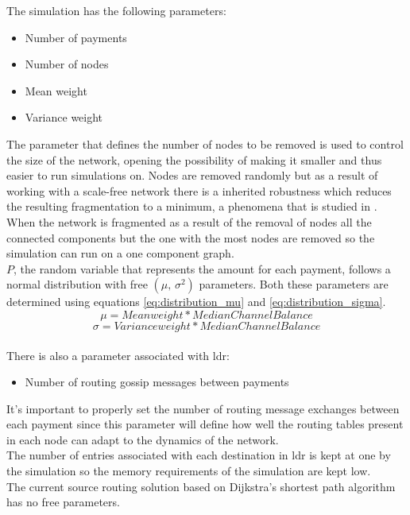 The simulation has the following parameters:
\begin{itemize}
    \item Number of payments
    \item Number of nodes
    \item Mean weight
    \item Variance weight
\end{itemize}
The parameter that defines the number of nodes to be removed is used to control the size of the network, opening the possibility of making it smaller and thus easier to run simulations on. Nodes are removed randomly but as a result of working with a scale-free network there is a inherited robustness \cite{network_science} which reduces the resulting fragmentation to a minimum, a phenomena that is studied in \cite{ln_topological}. When the network is fragmented as a result of the removal of nodes all the connected components but the one with the most nodes are removed so the simulation can run on a one component graph.\\
$P$, the random variable that represents the amount for each payment, follows a normal distribution with free $(\mu,\,\sigma^{2})$ parameters. Both these parameters are determined using equations \ref{eq:distribution_mu} and \ref{eq:distribution_sigma}. 
\begin{equation}
    \mu = Mean weight * Median Channel Balance
    \label{eq:distribution_mu}
\end{equation}
\begin{equation}
    \sigma = Variance weight * Median Channel Balance
    \label{eq:distribution_sigma}
\end{equation}
\\
There is also a parameter associated with \acrshort{ldr}:
\begin{itemize}
    \item Number of routing gossip messages between payments
\end{itemize}
It's important to properly set the number of routing message exchanges between each payment since this parameter will define how well the routing tables present in each node can adapt to the dynamics of the network.\\
The number of entries associated with each destination in \acrshort{ldr} is kept at one by the simulation so the memory requirements of the simulation are kept low.\\
The current source routing solution based on Dijkstra's shortest path algorithm has no free parameters.\\

